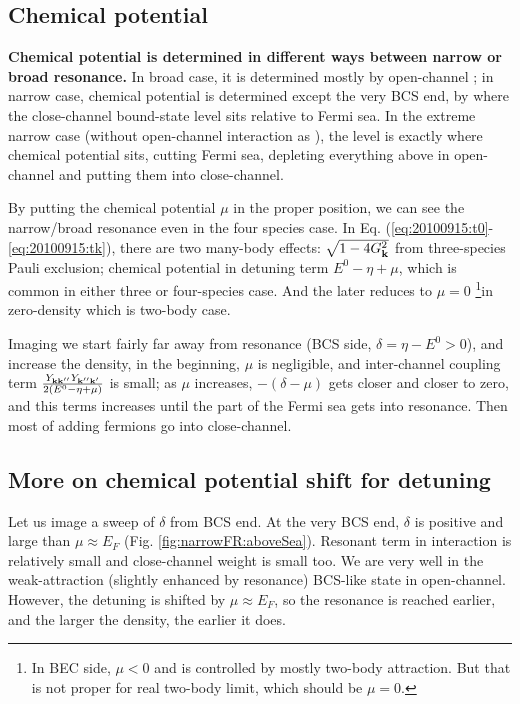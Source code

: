 \documentclass{article}
\renewcommand{\emph}[1]{\textbf{#1}}
\begin{document}
\subsection{Chemical potential}
\emph{Chemical potential is determined in different ways between narrow or broad resonance.  }In broad case, it is determined mostly by open-channel ; in narrow case, chemical potential is determined except the very BCS end,  by where the close-channel bound-state level sits relative to Fermi sea.  In the extreme narrow case (without open-channel interaction as \cite{GurarieNarrow}), the level is exactly where chemical potential sits, cutting Fermi sea, depleting everything above in open-channel and putting them into close-channel.   

By putting the chemical potential $\mu$ in the proper position, we can see the narrow/broad resonance even in the four species case.  In Eq. (\ref{eq:20100915:t0}-\ref{eq:20100915:tk}), there are two many-body effects: $\sqrt{1-4G_{\mathbf{k}}^{2}}$ from three-species Pauli exclusion; chemical potential in detuning term $E^{0}-\eta+\mu$, which is common in either three or four-species case.  And the later reduces to $\mu=0$ \footnote{In BEC side, $\mu<0$ and is controlled by mostly two-body attraction.  But that is not proper for real two-body limit, which should be $\mu=0$.}in zero-density which is two-body case. 

Imaging we start fairly far away from resonance (BCS side, $\delta=\eta-E^{0}>0$), and increase the density, in the beginning, $\mu$ is negligible, and inter-channel coupling term $\frac{Y_{\mathbf{k}\mathbf{k}''}Y_{\mathbf{k}''\mathbf{k}'}}{2(E^{0}-\eta+\mu)} $ is small; as $\mu$  increases, $-(\delta-\mu)$ gets closer and closer to zero, and this terms increases until the part of the Fermi sea gets into resonance.  Then most of adding fermions go into close-channel. 






\subsection{More on chemical potential shift for detuning}
Let us image a sweep of $\delta$ from BCS end.  At the very BCS end, $\delta$ is positive and large than $\mu\approx{}E_{F}$ (Fig. \ref{fig:narrowFR:aboveSea}). Resonant term in interaction is relatively small and close-channel weight is small too.  We are very well in the  weak-attraction (slightly enhanced by resonance) BCS-like state in open-channel.  However, the detuning is shifted by $\mu\approx{}E_{F}$, so the resonance is reached earlier, and the larger the density, the earlier it does.  
\end{document}
